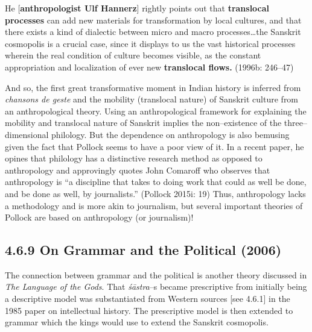 \begin{myquote}
He [\textbf{anthropologist Ulf Hannerz}] rightly points out that \textbf{translocal processes} can add new materials for transformation by local cultures, and that there exists a kind of dialectic between micro and macro processes…the Sanskrit cosmopolis is a crucial case, since it displays to us the vast historical processes wherein the real condition of culture becomes visible, as the constant appropriation and localization of ever new \textbf{translocal flows.} (1996b: 246–47)
\end{myquote}

\newpage

And so, the first great transformative moment in Indian history is inferred from\textit{ chansons de geste} and the mobility (translocal nature) of Sanskrit culture from an anthropological theory. Using an anthropological framework for explaining the mobility and translocal nature of Sanskrit implies the non–existence of the three–dimensional philology. But the dependence on anthropology is also bemusing given the fact that Pollock seems to have a poor view of it. In a recent paper, he opines that philology has a distinctive research method as opposed to anthropology and approvingly quotes John Comaroff who observes that anthropology is “a discipline that takes to doing work that could as well be done, and be done as well, by journalists.” (Pollock 2015i: 19) Thus, anthropology lacks a methodology and is more akin to journalism, but several important theories of Pollock are based on anthropology (or journalism)!


\vspace{-.3cm}

\subsection*{4.6.9 On Grammar and the Political (2006)}

\vspace{-.2cm}

The connection between grammar and the political is another theory discussed in \textit{The Language of the Gods}. That \textit{śāstra}–s became prescriptive from initially being a descriptive model was substantiated from Western sources [see 4.6.1] in the 1985 paper on intellectual history. The prescriptive model is then extended to grammar which the kings would use to extend the Sanskrit cosmopolis.

